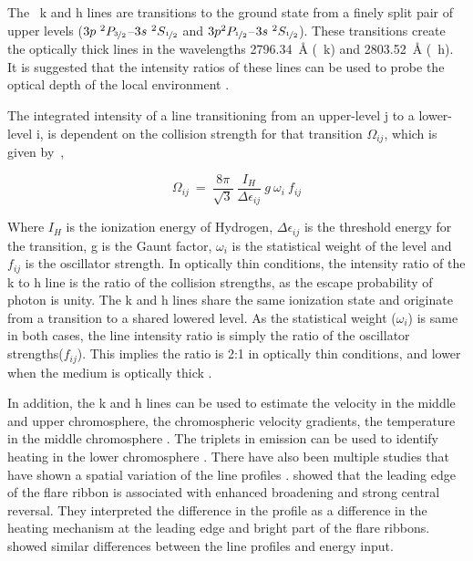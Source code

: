 The ~k and h lines are transitions to the ground state from a finely split pair of upper levels ($3p~^{2}P_{\nicefrac{3}{2}}${--}$3s~^{2}S_{\nicefrac{1}{2}}$ and $3p ^{2}P_{\nicefrac{1}{2}}${--}$3s~^{2}S_{\nicefrac{1}{2}}$). These transitions create the optically thick lines in the wavelengths 2796.34~{\AA} (~k) and 2803.52~{\AA} (~h). It is suggested that the intensity ratios of these lines can be used to probe the optical depth of the local environment \citep{kerr15}. 

The integrated intensity of a line transitioning from an upper-level j to a lower-level i, is dependent on the collision strength for that transition $\Omega_{ij}$, which is given by~\citep{henri62,mariska92},

\begin{equation*}
    \Omega_{ij}~=~\frac{8\pi}{\sqrt{3}}~\frac{I_{H}}{\Delta \epsilon_{ij}}~g~\omega_{i}~f_{ij}
\end{equation*}

\noindent Where $I_{H}$ is the ionization energy of Hydrogen, $\Delta \epsilon_{ij}$ is the threshold energy for the transition, g is the Gaunt factor, $\omega_{i}$ is the statistical weight of the level and $f_{ij}$ is the oscillator strength. In optically thin conditions, the intensity ratio of the k to h line is the ratio of the collision strengths, as the escape probability of photon is unity. The  k and h lines share the same ionization state and originate from a transition to a shared lowered level. As the statistical weight ($\omega_{i}$) is same in both cases, the line intensity ratio is simply the ratio of the oscillator strengths($f_{ij}$). This implies the ratio is 2:1 in optically thin conditions, and lower when the medium is optically thick \citep{kerr15,levens19}.

In addition, the  k and h lines can be used to estimate the velocity in the middle and upper chromosphere, the chromospheric velocity gradients, the temperature in the middle chromosphere \citep{leenarts13a,leenarts13b,pereira13}. The  triplets in emission can be used to identify heating in the lower chromosphere \citep{pereira15}. There have also been multiple studies that have shown a spatial variation of the  line profiles \citep{dalda23,panos18}. \cite{polito23} showed that the leading edge of the flare ribbon is associated with enhanced broadening and strong central reversal. They interpreted the difference in the profile as a difference in the heating mechanism at the leading edge and bright part of the flare ribbons. \cite{panos21,panos21_2} showed similar differences between the line profiles and energy input.

